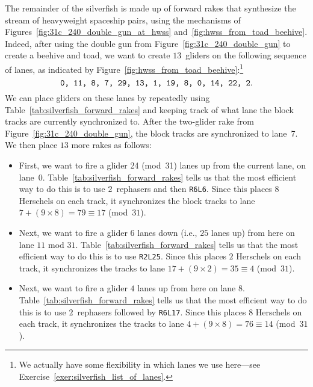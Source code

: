The remainder of the silverfish is made up of forward rakes that synthesize the stream of heavyweight spaceship pairs, using the mechanisms of Figures~\ref{fig:31c_240_double_gun_at_hwss} and~\ref{fig:hwss_from_toad_beehive}. Indeed, after using the double gun from Figure~\ref{fig:31c_240_double_gun} to create a beehive and toad, we want to create $13$~gliders on the following sequence of lanes, as indicated by Figure~\ref{fig:hwss_from_toad_beehive}:\footnote{We actually have some flexibility in which lanes we use here---see Exercise~\ref{exer:silverfish_list_of_lanes}.}\label{page:silverfish_lanes}
\[
\text{\texttt{0, 11, 8, 7, 29, 13, 1, 19, 8, 0, 14, 22, 2}.}
\]
We can place gliders on these lanes by repeatedly using Table~\ref{tab:silverfish_forward_rakes} and keeping track of what lane the block tracks are currently synchronized to. After the two-glider rake from Figure~\ref{fig:31c_240_double_gun}, the block tracks are synchronized to lane~7. We then place $13$ more rakes as follows:\smallskip

\begin{itemize}
	\item First, we want to fire a glider 24 (mod~31) lanes up from the current lane, on lane~0. Table~\ref{tab:silverfish_forward_rakes} tells us that the most efficient way to do this is to use $2$~rephasers and then \texttt{R6L6}. Since this places $8$ Herschels on each track, it synchronizes the block tracks to lane $7 + (9 \times 8) = 79 \equiv 17$ (mod~$31$).\smallskip
	
	\item Next, we want to fire a glider $6$ lanes down (i.e., $25$ lanes up) from here on lane $11$ mod $31$. Table~\ref{tab:silverfish_forward_rakes} tells us that the most efficient way to do this is to use \texttt{R2L25}. Since this places $2$ Herschels on each track, it synchronizes the tracks to lane $17 + (9 \times 2) = 35 \equiv 4$ (mod~$31$).\smallskip
	
	\item Next, we want to fire a glider $4$ lanes up from here on lane $8$. Table~\ref{tab:silverfish_forward_rakes} tells us that the most efficient way to do this is to use $2$~rephasers followed by \texttt{R6L17}. Since this places $8$ Herschels on each track, it synchronizes the tracks to lane $4 + (9 \times 8) = 76 \equiv 14$ (mod~$31$).\smallskip
\end{itemize}

